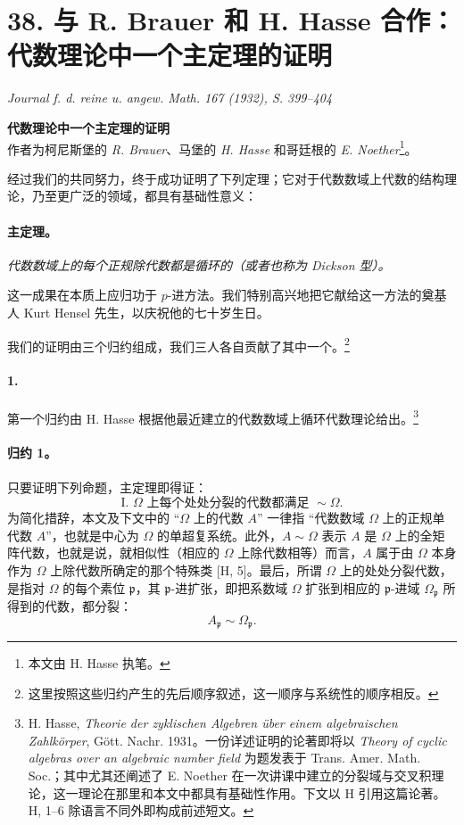 \documentclass[11pt]{article}
\providecommand{\glqq}{“}
\providecommand{\grqq}{”}
\begin{document}
\setcounter{footnote}{0}

\section*{38. 与 R. Brauer 和 H. Hasse 合作：代数理论中一个主定理的证明}

\begin{center}
\emph{Journal f. d. reine u. angew. Math. 167 (1932), S. 399--404}
\end{center}

\begin{center}
\textbf{代数理论中一个主定理的证明}\\[0.5em]
作者为柯尼斯堡的 \emph{R. Brauer}、马堡的 \emph{H. Hasse} 和哥廷根的 \emph{E. Noether}\footnote{本文由 H. Hasse 执笔。}。
\end{center}

经过我们的共同努力，终于成功证明了下列定理；它对于代数数域上代数的结构理论，乃至更广泛的领域，都具有基础性意义：

\paragraph{主定理。}
\emph{代数数域上的每个正规除代数都是循环的（或者也称为 Dickson 型）。}

这一成果在本质上应归功于 \(p\)-进方法。我们特别高兴地把它献给这一方法的奠基人 Kurt Hensel 先生，以庆祝他的七十岁生日。

我们的证明由三个归约组成，我们三人各自贡献了其中一个。\footnote{这里按照这些归约产生的先后顺序叙述，这一顺序与系统性的顺序相反。}

\paragraph{1.}
第一个归约由 H. Hasse 根据他最近建立的代数数域上循环代数理论给出。\footnote{H. Hasse, \emph{Theorie der zyklischen Algebren über einem algebraischen Zahlkörper}, Gött. Nachr. 1931。一份详述证明的论著即将以 \emph{Theory of cyclic algebras over an algebraic number field} 为题发表于 Trans. Amer. Math. Soc.；其中尤其还阐述了 E. Noether 在一次讲课中建立的分裂域与交叉积理论，这一理论在那里和本文中都具有基础性作用。下文以 H 引用这篇论著。H, 1--6 除语言不同外即构成前述短文。}

\paragraph{归约 1。}
只要证明下列命题，主定理即得证：
\[
\text{I. }\Omega\text{ 上每个处处分裂的代数都满足 } \sim \Omega .
\]
为简化措辞，本文及下文中的 \glqq{}\(\Omega\) 上的代数 \(A\)\grqq{} 一律指 \glqq{}代数数域 \(\Omega\) 上的正规单代数 \(A\)\grqq{}，也就是中心为 \(\Omega\) 的单超复系统。此外，\(A\sim\Omega\) 表示 \(A\) 是 \(\Omega\) 上的全矩阵代数，也就是说，就相似性（相应的 \(\Omega\) 上除代数相等）而言，\(A\) 属于由 \(\Omega\) 本身作为 \(\Omega\) 上除代数所确定的那个特殊类 [H, 5]。最后，所谓 \(\Omega\) 上的处处分裂代数，是指对 \(\Omega\) 的每个素位 \(\mathfrak p\)，其 \(\mathfrak p\)-进扩张，即把系数域 \(\Omega\) 扩张到相应的 \(\mathfrak p\)-进域 \(\Omega_{\mathfrak p}\) 所得到的代数，都分裂：
\[
A_{\mathfrak p}\sim \Omega_{\mathfrak p}.
\]
\end{document}
